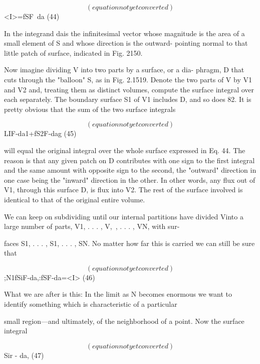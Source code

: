 \begin{equation}
(equation not yet converted)
\end{equation}
<I>=fSF~da (44)

In the integrand dais the infinitesimal vector whose magnitude is the
area of a small element of S and whose direction is the outward-
pointing normal to that little patch of surface, indicated in Fig. 2150.

Now imagine dividing V into two parts by a surface, or a dia-
phragm, D that cuts through the "balloon" S, as in Fig. 2.1519.
Denote the two parts of V by V1 and V2 and, treating them as distinct
volumes, compute the surface integral over each separately. The
boundary surface S1 of V1 includes D, and so does 82. It is pretty
obvious that the sum of the two surface integrals

\begin{equation}
(equation not yet converted)
\end{equation}
LIF-da1+fS2F-dag (45)

will equal the original integral over the whole surface expressed in
Eq. 44. The reason is that any given patch on D contributes with
one sign to the first integral and the same amount with opposite sign
to the second, the "outward" direction in one case being the "inward"
direction in the other. In other words, any flux out of V1, through
this surface D, is flux into V2. The rest of the surface involved is
identical to that of the original entire volume.

We can keep on subdividing until our internal partitions have
divided Vinto a large number of parts, V1, . . . , V,~, . . . , VN, with sur-

faces S1, . . . , S1, . . . , SN. No matter how far this is carried we can
still be sure that

\begin{equation}
(equation not yet converted)
\end{equation}
;N1fSiF-da,:fSF-da=<I> (46)

What we are after is this: In the limit as N becomes enormous we
want to identify something which is characteristic of a particular

small region---and ultimately, of the neighborhood of a point. Now
the surface integral

\begin{equation}
(equation not yet converted)
\end{equation}
Sir - da, (47)


